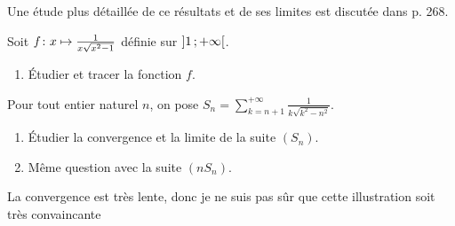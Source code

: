 \begin{remarque}
Une étude plus détaillée de ce résultats et de ses limites est discutée dans \cite{truc2019} p. 268.
\end{remarque}


\begin{exercice}
Soit $\fonctionligne[f]{x}{\frac{1}{x \sqrt{x^2 - 1}}}$ définie sur $\interoo{1}{+\infty}$.
\begin{enumerate}
\item Étudier et tracer la fonction $f$.
\end{enumerate}
Pour tout entier naturel $n$, on pose $S_n = \sum\limits_{k=n+1}^{+\infty} \frac{1}{k \sqrt{k^2 - n^2}}$.
\begin{enumerate}[resume]
\item Étudier la convergence et la limite de la suite $(S_n)$.

\item Même question avec la suite $(n S_n)$.
\end{enumerate}
\end{exercice}


\begin{marginfigure}
    \centering
    
    \caption{La convergence est très lente, donc je ne suis pas sûr que cette illustration soit très convaincante}
\end{marginfigure}

